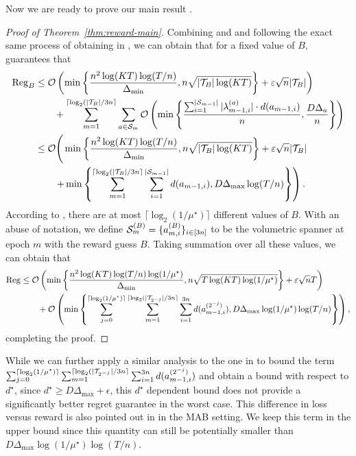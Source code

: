 Now we are ready to prove our main result .
\begin{proof}[Proof of Theorem~\ref{thm:reward-main}]
Combining  and  and following the exact same process of obtaining  in , we can obtain that for a fixed value of $B$,  guarantees that
    \begin{align*}
        {\mathrm{Reg}}_B &\leq \mathcal{O}\left(\min\left\{\frac{n^2\log(KT)\log(T/n)}{\Delta_{\min}}, n\sqrt{|{\mathcal{T}}_B|\log(KT)}\right\}+\varepsilon\sqrt{n}|{\mathcal{T}}_B|\right)\\
        &\qquad + \sum_{m= 1}^{\lceil\log_2(|{\mathcal{T}}_B|/3n\rceil}\sum_{a\in {\mathcal{S}}_m}\mathcal{O}\left(\min\left\{\frac{\sum_{i=1}^{|{\mathcal{S}}_{m-1}|}|\lambda_{m-1,i}^{(a)}|\cdot d(a_{m-1,i})}{n}, \frac{D\Delta_a}{n}\right\}\right) \\
        &\leq \mathcal{O}\Bigg(\min\left\{\frac{n^2\log(KT)\log(T/n)}{\Delta_{\min}}, n\sqrt{|{\mathcal{T}}_B|\log(KT)}\right\}+\varepsilon\sqrt{n}|{\mathcal{T}}_B|\\
        &\qquad \left.+\min\left\{\sum_{m= 1}^{\lceil\log_2(|{\mathcal{T}}_B|/3n\rceil}\sum_{i=1}^{|{\mathcal{S}}_{m-1}|} d(a_{m-1,i}), D\Delta_{\max}\log(T/n)\right\}\right).
    \end{align*}
    According to , there are at most $\lceil\log_2(1/\mu^\star)\rceil$ different values of $B$. With an abuse of notation, we define ${\mathcal{S}}_{m}^{(B)}=\{a_{m,i}^{(B)}\}_{i\in [3n]}$ to be the volumetric spanner at epoch $m$ with the reward guess $B$.
    Taking summation over all these values, we can obtain that
    \begin{align*}
        {\mathrm{Reg}} &\leq \mathcal{O}\left(\min\left\{\frac{n^2\log(KT)\log(T/n)\log(1/\mu^\star)}{\Delta_{\min}}, n\sqrt{T\log(KT)\log(1/\mu^\star)}\right\}+\varepsilon\sqrt{n}T\right)\\
        &\qquad+\mathcal{O}\left(\min\left\{\sum_{j=0}^{\lceil\log_2(1/\mu^\star)\rceil}\sum_{m=1}^{\lceil\log_2(|{\mathcal{T}}_{2^{-j}}|/3n\rceil}\sum_{i=1}^{3n} d(a_{m-1,i}^{(2^{-j})}), D\Delta_{\max}\log(1/\mu^\star)\log(T/n)\right\}\right),
    \end{align*}
    completing the proof.
\end{proof}    

    While we can further apply a similar analysis to the one in  to bound the term $\sum_{j=0}^{\lceil\log_2(1/\mu^\star)\rceil}\sum_{m=1}^{\lceil\log_2(|{\mathcal{T}}_{2^{-j}}|/3n\rceil}\sum_{i=1}^{3n} d(a_{m-1,i}^{(2^{-j})})$ and obtain a bound with respect to $d^\star$, since $d^\star\geq D\Delta_{\max}+\epsilon$, this $d^\star$ dependent bound does not provide a significantly better regret guarantee in the worst case. This  difference in loss versus reward is also pointed out in \citep{schlisselberg2024delay} in the MAB setting. We keep this term in the upper bound since this quantity can still be potentially smaller than $D\Delta_{\max}\log(1/\mu^\star)\log(T/n)$.
